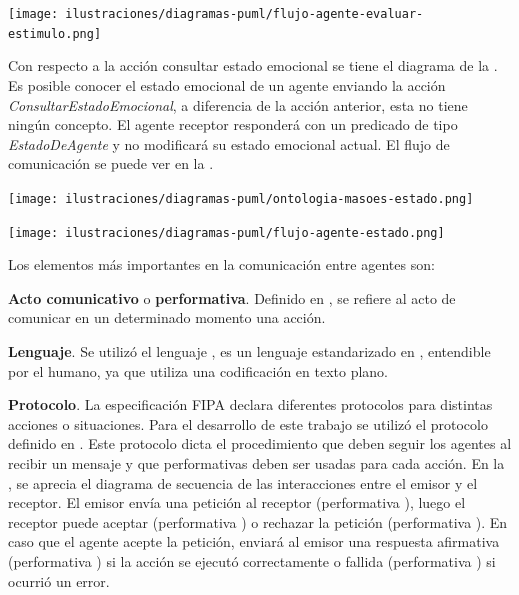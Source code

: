\begin{ilustracion}[fuente=\yo, etiqueta=flujo-agente-evaluar-estimulo, titulo={Flujo de Comunicación, Acción Evaluar Estímulo}]
\texttt{[image: ilustraciones/diagramas-puml/flujo-agente-evaluar-estimulo.png]}
\end{ilustracion}

Con respecto a la acción consultar estado emocional se tiene el diagrama de la .
Es posible conocer el estado emocional de un agente enviando la acción \textit{ConsultarEstadoEmocional},
a diferencia de la acción anterior, esta no tiene ningún concepto. El agente receptor responderá
con un predicado de tipo \textit{EstadoDeAgente} y no modificará su estado emocional actual.
El flujo de comunicación se puede ver en la .

\begin{ilustracion}[fuente=\yo, etiqueta=ontologia-masoes-estado, titulo={Ontología para MASOES, Acción Consultar Estado del Agente}]
\texttt{[image: ilustraciones/diagramas-puml/ontologia-masoes-estado.png]}
\end{ilustracion}

\begin{ilustracion}[fuente=\yo, etiqueta=flujo-agente-estado, titulo={Flujo de Comunicación, Acción Consultar Estado del Agente}]
\texttt{[image: ilustraciones/diagramas-puml/flujo-agente-estado.png]}
\end{ilustracion}


Los elementos más importantes en la comunicación entre agentes son:

\textbf{Acto comunicativo} o \textbf{performativa}. Definido en \cite{fipaCommnicativeAct},
se refiere al acto de comunicar en un determinado momento una acción.

\textbf{Lenguaje}. Se utilizó el lenguaje 
, es un lenguaje estandarizado en \cite{fipaLanguage}, entendible por el humano,
ya que utiliza una codificación en texto plano.

\textbf{Protocolo}. La especificación FIPA declara diferentes protocolos para
distintas acciones o situaciones. Para el desarrollo de este trabajo se utilizó
el protocolo  definido en
\cite{fipaProtocol}. Este protocolo dicta el procedimiento que deben seguir los
agentes al recibir un mensaje y que performativas deben ser usadas para cada
acción. En la , se aprecia el
diagrama de secuencia de las interacciones entre el emisor y el receptor.
El emisor envía una petición al receptor (performativa
), luego el receptor puede aceptar
(performativa ) o rechazar la petición
(performativa ). En caso que el agente acepte
la petición, enviará al emisor una respuesta afirmativa (performativa
) si la acción se ejecutó correctamente o
fallida (performativa ) si ocurrió un error.

